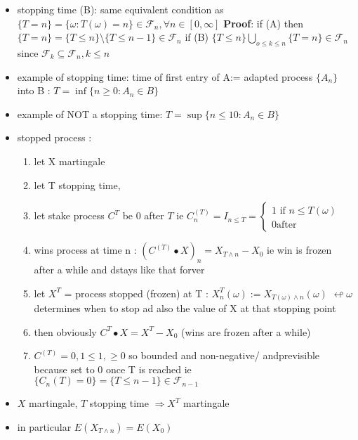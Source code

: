 \documentclass[10pt,landscape,a4paper]{article}
\newcommand{\myFF}{\mathcal{F}}
\begin{document}
\begin{multicols*}{3}
\begin{spacing}{0.5}
\begin{itemize}
\item stopping time (B): same equivalent condition as $ \{ T = n \} = \{ \omega : T(\omega) = n \} \in \myFF_{n}, \forall n \in [0,\infty]$ \textbf{Proof}: if (A) then $ \{ T = n \} =  \{ T \le n \} \setminus \{ T \le n-1 \} \in \myFF_{n}$ if (B) $\{ T \le n \} \bigcup_{o \le k \le n} \{ T = n \} \in \myFF_{n} $ since $\myFF_{k} \subseteq \myFF_{n} , k \le n$

\item example of stopping time: time of first entry of A:= adapted process $\{A_n\}$ into B : $T = \inf \{n \ge 0 : A_n \in B\} $

\item example of NOT a stopping time: $T = \sup \{n \le 10 : A_n \in B\} $

\item stopped process : 
\begin{enumerate}
\item let X martingale
\item let T stopping time, 
\item let stake process $C^T$  be 0 after $T$ ie $C_n^{(T)} = I_{n \le T} =  \begin{cases} 1 \text{ if } n \le T(\omega) \\ 0 \text{after}\end{cases} $

\item wins process at time n : ${(C^{(T)} \bullet X)}_n= X_{T \wedge n} - X_0$ ie win is frozen after a while and dstays like that forver

\item let $X^T$ = process stopped (frozen) at T : $X_n^T(\omega) := X_{T(\omega) \wedge n}(\omega)$ $\looparrowleft \omega$ determines when to stop ad  also the value of X at that stopping point

\item then obviously $C^T \bullet X = X^T-X_0$ (wins are frozen after a while)

\item $C^{(T)}=0,1 \le 1, \ge 0$ so bounded and non-negative/ andprevisible because set to 0 once T is reached ie $\{ C_n{(T) = 0 }\} = \{T \le n-1\} \in \myFF_{n-1}$

\end{enumerate}

\item $X$ martingale, $T$ stopping time $\Rightarrow X^T$ martingale
\item in particular $E(X_{T \wedge n}) = E(X_0)$


\end{itemize}
\end{spacing}
\end{multicols*}
\end{document}
